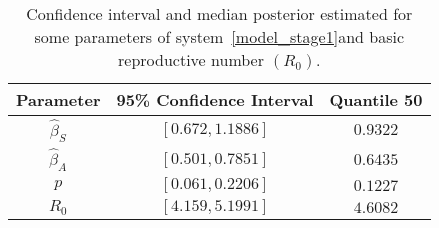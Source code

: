 \begin{table}[h!]
\begin{center}
	\begin{tabular}{ccc}
		\toprule
	    Parameter & 95\% Confidence Interval & Quantile 50
			\\
			\midrule
            $\hat{\beta}_S$ & $[0.672, 1.1886]$   &  $0.9322$ \\
            $\hat{\beta}_A$ & $[0.501, 0.7851]$  &  $0.6435$ \\
            $p$       & $[0.061, 0.2206]$ &  $0.1227$ \\
            $R_0$ & $[4.159, 5.1991]$ &  $4.6082$ \\
			\bottomrule
	\end{tabular}
  \caption{Confidence interval and median posterior estimated for some
  parameters of system~\eqref{model_stage1}and basic reproductive number
  $(R_0)$.}\label{table_icparam}
\end{center}
\end{table}

